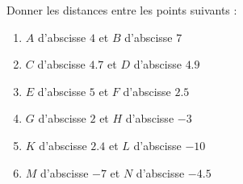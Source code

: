 
\begin{exercice}\label{exo2smath-0047}

    Donner les distances entre les points suivants :
    \begin{enumerate}
        \item
            \( A\) d'abscisse \( 4\) et \( B\) d'abscisse \( 7\)
        \item
            \( C \) d'abscisse \( 4.7\) et \( D\) d'abscisse \( 4.9\)
        \item
            \( E \) d'abscisse \( 5\) et \( F\) d'abscisse \( 2.5\)
        \item
            \( G \) d'abscisse \( 2\) et \( H\) d'abscisse \( -3\)
        \item
            \( K \) d'abscisse \( 2.4\) et \( L\) d'abscisse \( -10\)
        \item
            \( M \) d'abscisse \( -7\) et \( N\) d'abscisse \( -4.5\)
    \end{enumerate}

\end{exercice}
